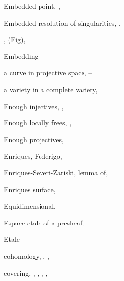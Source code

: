 {{\noindent\hspace*{0.0bp}Embedded point, , \par
\noindent\hspace*{0.0bp}Embedded resolution of singularities, ,\par
\noindent\hspace*{15.0bp},  (Fig), \par
\noindent\hspace*{0.0bp}Embedding\par
\noindent\hspace*{7.5bp}a curve in projective space, --\par
\noindent\hspace*{7.5bp}a variety in a complete variety, \par
\noindent\hspace*{0.0bp}Enough injectives, , \par
\noindent\hspace*{0.0bp}Enough locally frees, , \par
\noindent\hspace*{0.0bp}Enough projectives, \par
\noindent\hspace*{0.0bp}Enriques, Federigo, \par
\noindent\hspace*{0.0bp}Enriques-Severi-Zariski, lemma of, \par
\noindent\hspace*{0.0bp}Enriques surface, \par
\noindent\hspace*{0.0bp}Equidimensional, \par
\noindent\hspace*{0.0bp}Espace etale of a presheaf, \par
\noindent\hspace*{0.0bp}Etale\par
\noindent\hspace*{7.5bp}cohomology, , , \par
\noindent\hspace*{7.5bp}covering, , , , , \par
}}
